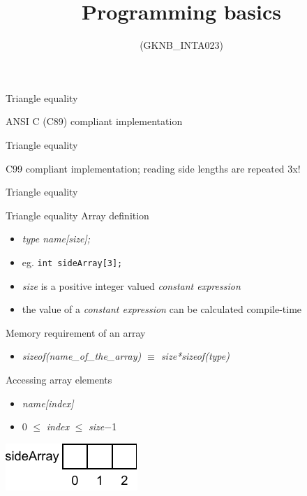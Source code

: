 \documentclass[usenames,dvipsnames,aspectratio=169]{beamer}
\title[Lecture 4.]{Programming basics}
\subtitle{(GKNB\_INTA023)}
\begin{document}
\begin{frame}[plain]
  \titlepage
  \logoalul
\end{frame}

\begin{frame}{Triangle equality}
  \begin{exampleblock}{ ANSI C (C89) compliant implementation}
  \tiny
  \vspace{-.3cm}
  
  \vspace{-.3cm}
  \end{exampleblock}
\end{frame}

\begin{frame}{Triangle equality}
  \footnotesize
  \begin{exampleblock}{ C99 compliant implementation; reading side lengths are repeated 3x!}
  \tiny
  \vspace{-.3cm}
  
  \vspace{-.3cm}
  \end{exampleblock}
\end{frame}

\begin{frame}{Triangle equality}
  \begin{exampleblock}{}
    \tiny
    \vspace{-.3cm}
    
    \vspace{-.3cm}
  \end{exampleblock}
\end{frame}

\begin{frame}[fragile]{Triangle equality}
  Array definition
  \begin{itemize}
    \item \emph{type name[size];}
    \item eg. \texttt{int sideArray[3];}
    \item \emph{size} is a positive integer valued \emph{constant expression}
    \item the value of a \emph{constant expression} can be calculated compile-time
  \end{itemize}
  Memory requirement of an array
  \begin{itemize}
    \item[] \emph{sizeof(name\_of\_the\_array) $\equiv$ size*sizeof(type)}
  \end{itemize}
  Accessing array elements
  \begin{itemize}
    \item \emph{name[index]}
    \item 0 $\leq$ \emph{index} $\leq$ \emph{size}$-$1
  \end{itemize}
  \hspace{4mm}\includegraphics[]{array.pdf}
\end{frame}
\end{document}
